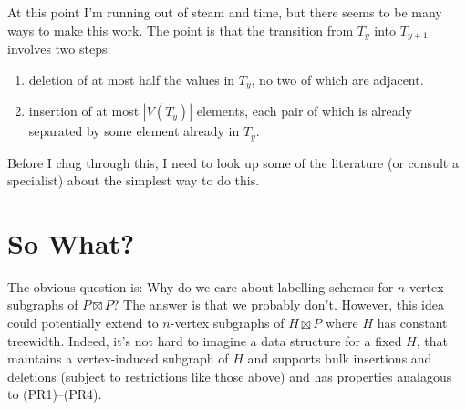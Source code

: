 \documentclass[kpfonts]{patmorin}
\begin{document}
At this point I'm running out of steam and time, but there seems to be many ways to make this work.  The point is that the transition from $T_y$ into $T_{y+1}$ involves two steps:
\begin{enumerate}
  \item deletion of at most half the values in $T_y$, no two of which are adjacent.
  \item insertion of at most $|V(T_y)|$ elements, each pair of which is already separated by some element already in $T_y$.
\end{enumerate}
Before I chug through this, I need to look up some of the literature (or consult a specialist) about the simplest way to do this.

\section{So What?}

The obvious question is: Why do we care about labelling schemes for $n$-vertex subgraphs of $P\boxtimes P$? The answer is that we probably don't.  However, this idea could potentially extend to $n$-vertex subgraphs of $H\boxtimes P$ where $H$ has constant treewidth.  Indeed, it's not hard to imagine a data structure for a fixed $H$, that maintains a vertex-induced subgraph of $H$ and supports bulk insertions and deletions (subject to restrictions like those above) and has properties analagous to (PR1)--(PR4).









% 
% 
% 
% 
% 
\end{document}
